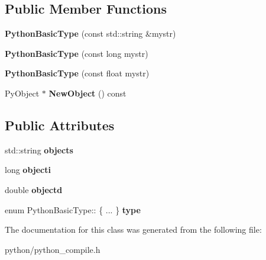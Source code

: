 \subsection*{Public Member Functions}
\begin{DoxyCompactItemize}
\item 
{\bfseries Python\+Basic\+Type} (const std\+::string \&mystr)\hypertarget{classPythonBasicType_afc8db2e0551a87be185b6a5f46f6270a}{}\label{classPythonBasicType_afc8db2e0551a87be185b6a5f46f6270a}

\item 
{\bfseries Python\+Basic\+Type} (const long mystr)\hypertarget{classPythonBasicType_aa6cec7e0e760497ee24c04336b9aae14}{}\label{classPythonBasicType_aa6cec7e0e760497ee24c04336b9aae14}

\item 
{\bfseries Python\+Basic\+Type} (const float mystr)\hypertarget{classPythonBasicType_a923fb41296c38226464b2c9e125539f0}{}\label{classPythonBasicType_a923fb41296c38226464b2c9e125539f0}

\item 
Py\+Object $\ast$ {\bfseries New\+Object} () const \hypertarget{classPythonBasicType_ad313c38e1650c7b2cec31bfb3602fe2b}{}\label{classPythonBasicType_ad313c38e1650c7b2cec31bfb3602fe2b}

\end{DoxyCompactItemize}
\subsection*{Public Attributes}
\begin{DoxyCompactItemize}
\item 
std\+::string {\bfseries objects}\hypertarget{classPythonBasicType_afe85e2a026909c608bc9fe1fd3fa6be9}{}\label{classPythonBasicType_afe85e2a026909c608bc9fe1fd3fa6be9}

\item 
long {\bfseries objecti}\hypertarget{classPythonBasicType_a4e63cef1d0d4caa634308c37f6828e0d}{}\label{classPythonBasicType_a4e63cef1d0d4caa634308c37f6828e0d}

\item 
double {\bfseries objectd}\hypertarget{classPythonBasicType_a9f72e85e6f670d556dfb3f7e1fb8579c}{}\label{classPythonBasicType_a9f72e85e6f670d556dfb3f7e1fb8579c}

\item 
enum Python\+Basic\+Type\+:: \{ ... \}  {\bfseries type}\hypertarget{classPythonBasicType_a87d415dd6cf5bc6e3cced9c8b4c887e0}{}\label{classPythonBasicType_a87d415dd6cf5bc6e3cced9c8b4c887e0}

\end{DoxyCompactItemize}


The documentation for this class was generated from the following file\+:\begin{DoxyCompactItemize}
\item 
python/python\+\_\+compile.\+h\end{DoxyCompactItemize}
